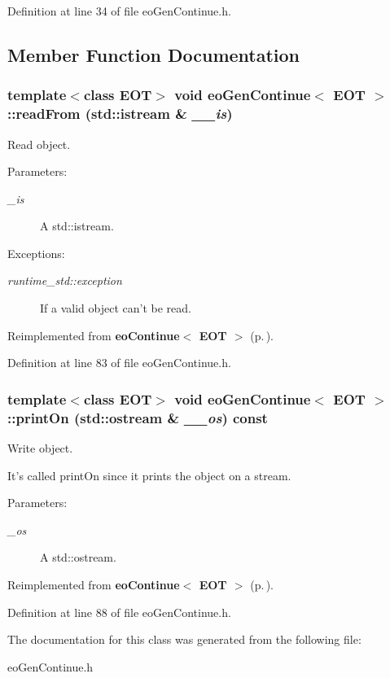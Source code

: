 Definition at line 34 of file eo\-Gen\-Continue.h.

\subsection{Member Function Documentation}
\subsubsection{\setlength{\rightskip}{0pt plus 5cm}template$<$class EOT$>$ void {\bf eo\-Gen\-Continue}$<$ {\bf EOT} $>$::read\-From (std::istream \& {\em \_\-\_\-is})\hspace{0.3cm}{\tt  [inline, virtual]}}\label{classeo_gen_continue_a6}


Read object. 

\begin{Desc}
\item[Parameters:]
\begin{description}
\item[{\em \_\-is}]A std::istream. \end{description}
\end{Desc}
\begin{Desc}
\item[Exceptions:]
\begin{description}
\item[{\em runtime\_\-std::exception}]If a valid object can't be read. \end{description}
\end{Desc}


Reimplemented from {\bf eo\-Continue$<$ EOT $>$} {\rm (p.\,\pageref{classeo_continue_a1})}.

Definition at line 83 of file eo\-Gen\-Continue.h.
\subsubsection{\setlength{\rightskip}{0pt plus 5cm}template$<$class EOT$>$ void {\bf eo\-Gen\-Continue}$<$ {\bf EOT} $>$::print\-On (std::ostream \& {\em \_\-\_\-os}) const\hspace{0.3cm}{\tt  [inline, virtual]}}\label{classeo_gen_continue_a7}


Write object. 

It's called print\-On since it prints the object on a stream. \begin{Desc}
\item[Parameters:]
\begin{description}
\item[{\em \_\-os}]A std::ostream. \end{description}
\end{Desc}


Reimplemented from {\bf eo\-Continue$<$ EOT $>$} {\rm (p.\,\pageref{classeo_continue_a2})}.

Definition at line 88 of file eo\-Gen\-Continue.h.

The documentation for this class was generated from the following file:\begin{CompactItemize}
\item 
eo\-Gen\-Continue.h\end{CompactItemize}
